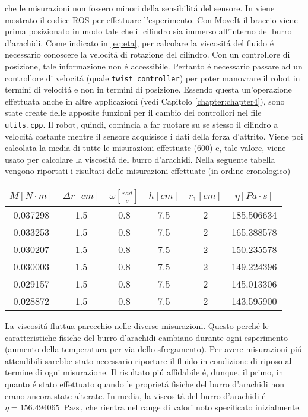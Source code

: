 che le misurazioni non fossero minori della sensibilit\'{a} del sensore.
In \cite{viscosity} viene mostrato il codice ROS per effettuare l'esperimento. 
Con MoveIt il braccio viene prima posizionato in modo tale che il cilindro sia immerso all'interno del burro d'arachidi. 
Come indicato in \ref{eq:eta}, per calcolare la viscosit\'{a} del fluido \'{e} necessario conoscere 
la velocit\'{a} di rotazione del cilindro. Con un controllore di posizione, tale informazione non \'{e} accessibile. 
Pertanto \'{e} necessario passare ad un controllore di velocit\'{a} (quale \verb|twist_controller|) per poter manovrare il robot in 
termini di velocit\'{a} e non in termini di posizione. Essendo questa un'operazione effettuata anche in altre applicazioni (vedi  
Capitolo \ref{chapter:chapter4}), sono state create delle apposite funzioni per il cambio dei controllori nel file \verb|utils.cpp|. 
Il robot, quindi, comincia a far ruotare su se stesso il cilindro a velocit\'{a} costante mentre il sensore acquisisce i dati della 
forza d'attrito. 
Viene poi calcolata la media di tutte le misurazioni effettuate (600) e, tale valore, viene usato per calcolare la viscosit\'{a} 
del burro d'arachidi. 
Nella seguente tabella vengono riportati i risultati delle misurazioni effettuate (in ordine cronologico)
\begin{center}
    \begin{tabular}{ ||c|c|c|c|c|c|| } 
     \hline
     $M \left[N \cdot m\right]$ & $\Delta r \left[cm\right]$ & $\omega \left[\frac{rad}{s}\right]$ & $h \left[cm\right]$ & $r_{1} \left[cm\right]$ & $\eta \left[Pa \cdot s\right]$\\
     \hline\hline 
     0.037298 & 1.5 & 0.8 & 7.5 & 2 & 185.506634 \\ 
     0.033253 & 1.5 & 0.8 & 7.5 & 2 & 165.388578 \\ 
     0.030207 & 1.5 & 0.8 & 7.5 & 2 & 150.235578 \\ 
     0.030003 & 1.5 & 0.8 & 7.5 & 2 & 149.224396 \\ 
     0.029157 & 1.5 & 0.8 & 7.5 & 2 & 145.013306 \\ 
     0.028872 & 1.5 & 0.8 & 7.5 & 2 & 143.595900 \\ 
     \hline
    \end{tabular}
\end{center}
La viscosit\'{a} fluttua parecchio nelle diverse misurazioni. Questo perch\'{e} le caratteristiche fisiche del burro d'arachidi 
cambiano durante ogni esperimento (aumento della temperatura per via dello sfregamento). Per avere misurazioni pi\'{u} attendibili 
sarebbe stato necessario riportare il fluido in condizione di riposo al termine di ogni misurazione. Il risultato pi\'{u} affidabile 
\'{e}, dunque, il primo, in quanto \'{e} stato effettuato quando le propriet\'{a} fisiche del burro d'arachidi non erano ancora 
state alterate.
In media, la viscosit\'{a} del burro d'arachidi \'{e} $\eta = 156.494065$ $\text{Pa} \cdot \text{s}$, che rientra nel range di 
valori noto specificato inizialmente. 